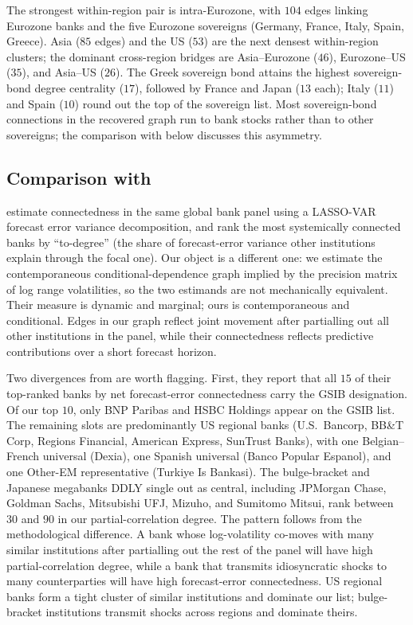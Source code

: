 The strongest within-region pair is intra-Eurozone, with $104$ edges linking Eurozone banks and the five Eurozone sovereigns (Germany, France, Italy, Spain, Greece). Asia ($85$ edges) and the US ($53$) are the next densest within-region clusters; the dominant cross-region bridges are Asia--Eurozone ($46$), Eurozone--US ($35$), and Asia--US ($26$). The Greek sovereign bond attains the highest sovereign-bond degree centrality ($17$), followed by France and Japan ($13$ each); Italy ($11$) and Spain ($10$) round out the top of the sovereign list. Most sovereign-bond connections in the recovered graph run to bank stocks rather than to other sovereigns; the comparison with \textcite{demirer2018estimating} below discusses this asymmetry.

\subsection{Comparison with \textcite{demirer2018estimating}}

\textcite{demirer2018estimating} estimate connectedness in the same global bank panel using a LASSO-VAR forecast error variance decomposition, and rank the most systemically connected banks by ``to-degree'' (the share of forecast-error variance other institutions explain through the focal one). Our object is a different one: we estimate the contemporaneous conditional-dependence graph implied by the precision matrix of log range volatilities, so the two estimands are not mechanically equivalent. Their measure is dynamic and marginal; ours is contemporaneous and conditional. Edges in our graph reflect joint movement after partialling out all other institutions in the panel, while their connectedness reflects predictive contributions over a short forecast horizon.

Two divergences from \textcite{demirer2018estimating} are worth flagging. First, they report that all $15$ of their top-ranked banks by net forecast-error connectedness carry the GSIB designation. Of our top $10$, only BNP Paribas and HSBC Holdings appear on the GSIB list. The remaining slots are predominantly US regional banks (U.S.\ Bancorp, BB\&T Corp, Regions Financial, American Express, SunTrust Banks), with one Belgian--French universal (Dexia), one Spanish universal (Banco Popular Espanol), and one Other-EM representative (Turkiye Is Bankasi). The bulge-bracket and Japanese megabanks DDLY single out as central, including JPMorgan Chase, Goldman Sachs, Mitsubishi UFJ, Mizuho, and Sumitomo Mitsui, rank between $30$ and $90$ in our partial-correlation degree. The pattern follows from the methodological difference. A bank whose log-volatility co-moves with many similar institutions after partialling out the rest of the panel will have high partial-correlation degree, while a bank that transmits idiosyncratic shocks to many counterparties will have high forecast-error connectedness. US regional banks form a tight cluster of similar institutions and dominate our list; bulge-bracket institutions transmit shocks across regions and dominate theirs.


